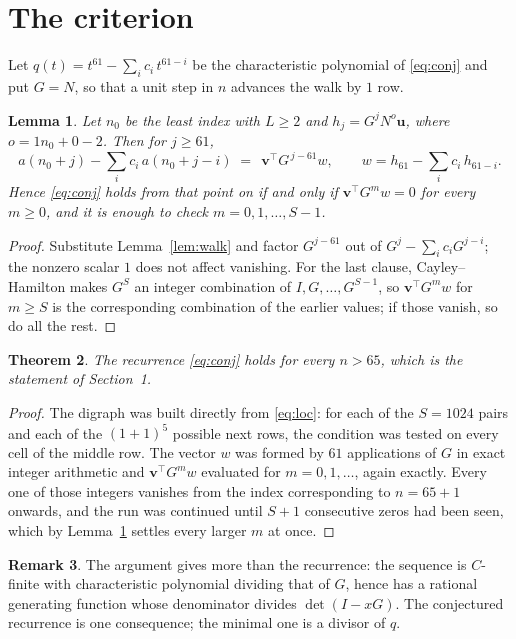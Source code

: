 \documentclass[11pt,a4paper]{article}
\theoremstyle{plain}
\newtheorem{theorem}{Theorem}
\newtheorem{lemma}[theorem]{Lemma}
\theoremstyle{definition}
\newtheorem{remark}[theorem]{Remark}
\begin{document}
\section{The criterion}

Let $q(t)=t^{61}-\sum_i c_i\,t^{61-i}$ be the characteristic polynomial of
\eqref{eq:conj} and put $G=N$, so that a unit step in $n$ advances the walk by
$1$ row.

\begin{lemma}\label{lem:crit}
Let $n_0$ be the least index with $L\ge2$ and $h_j=G^{j}N^{o}\mathbf{u}$, where
$o=1n_0+0-2$. Then for $j\ge61$,
\[
a(n_0+j)-\sum_i c_i\,a(n_0+j-i)\;=\;\,\mathbf{v}^{\!\top}G^{\,j-61}w,
\qquad w=h_{61}-\sum_i c_i\,h_{61-i} .
\]
Hence \eqref{eq:conj} holds from that point on if and only if
$\mathbf{v}^{\!\top}G^{m}w=0$ for every $m\ge0$, and it is enough to check
$m=0,1,\dots,S-1$.
\end{lemma}

\begin{proof}
Substitute Lemma~\ref{lem:walk} and factor $G^{j-61}$ out of
$G^{j}-\sum_ic_iG^{j-i}$; the nonzero scalar $1$ does not affect
vanishing. For the last clause, Cayley--Hamilton makes $G^{S}$ an integer combination of
$I,G,\dots,G^{S-1}$, so $\mathbf{v}^{\!\top}G^{m}w$ for $m\ge S$ is the corresponding
combination of the earlier values; if those vanish, so do all the rest.
\end{proof}

\begin{theorem}
The recurrence \eqref{eq:conj} holds for every $n>65$, which is the statement of
Section~1.
\end{theorem}

\begin{proof}
The digraph was built directly from \eqref{eq:loc}: for each of the $S=1024$ pairs and each
of the $(1+1)^{5}$ possible next rows, the condition was tested on every cell of
the middle row. The vector $w$ was formed by $61$ applications of $G$ in exact integer
arithmetic and $\mathbf{v}^{\!\top}G^{m}w$ evaluated for $m=0,1,\dots$, again exactly.
Every one of those integers vanishes from the index corresponding to $n=65+1$ onwards,
and the run was continued until $S+1$ consecutive zeros had been seen, which by
Lemma~\ref{lem:crit} settles every larger $m$ at once.
\end{proof}

\begin{remark}
The argument gives more than the recurrence: the sequence is $C$-finite with characteristic
polynomial dividing that of $G$, hence has a rational generating function whose denominator
divides $\det(I-xG)$. The conjectured recurrence is one consequence; the minimal one is a
divisor of $q$.
\end{remark}
\end{document}
